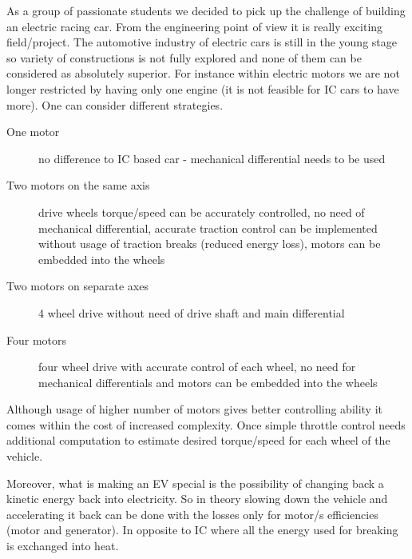 As a group of passionate students we decided to pick up the challenge of building an electric racing car. From the engineering point of view it is really exciting field/project. The automotive industry of electric cars is still in the young stage so variety of constructions is not fully explored and none of them can be considered as absolutely superior.
For instance within electric motors we are not longer restricted by having only one engine (it is not feasible for IC cars to have more). One can consider different strategies.
\begin{description}
    \item[One motor] no difference to IC based car - mechanical differential needs to be used
    \item[Two motors on the same axis] drive wheels torque/speed can be accurately controlled, no need of mechanical differential, accurate traction control can be implemented without usage of traction breaks (reduced energy loss), motors can be embedded into the wheels
    \item[Two motors on separate axes] 4 wheel drive without need of drive shaft and main differential
    \item[Four motors] four wheel drive with accurate control of each wheel, no need for mechanical differentials and motors can be embedded into the wheels
\end{description}
Although usage of higher number of motors gives better controlling ability it comes within the cost of increased complexity. Once simple throttle control needs additional computation to estimate desired torque/speed for each wheel of the vehicle.

Moreover, what is making an EV special is the possibility of changing back a kinetic energy back into electricity. So in theory slowing down the vehicle and accelerating it back can be done with the losses only for motor/s efficiencies (motor and generator). In opposite to IC where all the energy used for breaking is exchanged into heat.





